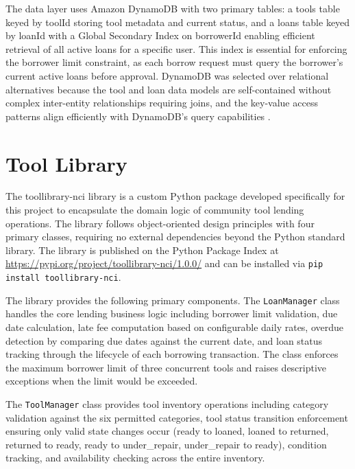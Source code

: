 \documentclass[conference]{IEEEtran}
\begin{document}
The data layer uses Amazon DynamoDB with two primary tables: a tools table keyed by toolId storing tool metadata and current status, and a loans table keyed by loanId with a Global Secondary Index on borrowerId enabling efficient retrieval of all active loans for a specific user. This index is essential for enforcing the borrower limit constraint, as each borrow request must query the borrower's current active loans before approval. DynamoDB was selected over relational alternatives because the tool and loan data models are self-contained without complex inter-entity relationships requiring joins, and the key-value access patterns align efficiently with DynamoDB's query capabilities \cite{awsdynamodb}.

\section{Tool Library}

The toollibrary-nci library is a custom Python package developed specifically for this project to encapsulate the domain logic of community tool lending operations. The library follows object-oriented design principles with four primary classes, requiring no external dependencies beyond the Python standard library. The library is published on the Python Package Index at \url{https://pypi.org/project/toollibrary-nci/1.0.0/} and can be installed via \texttt{pip install toollibrary-nci}.

The library provides the following primary components. The \texttt{LoanManager} class handles the core lending business logic including borrower limit validation, due date calculation, late fee computation based on configurable daily rates, overdue detection by comparing due dates against the current date, and loan status tracking through the lifecycle of each borrowing transaction. The class enforces the maximum borrower limit of three concurrent tools and raises descriptive exceptions when the limit would be exceeded.

The \texttt{ToolManager} class provides tool inventory operations including category validation against the six permitted categories, tool status transition enforcement ensuring only valid state changes occur (ready to loaned, loaned to returned, returned to ready, ready to under\_repair, under\_repair to ready), condition tracking, and availability checking across the entire inventory.
\end{document}
